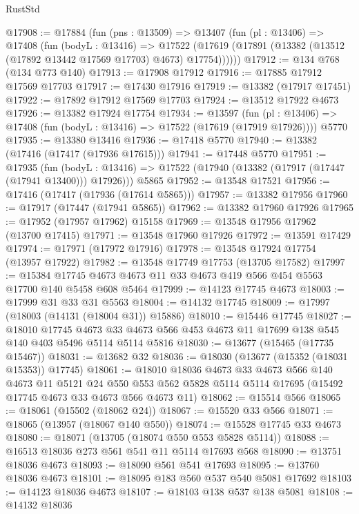 \begin{lexlean}{RustStd}
\begin{coremodule}
@17908 := @17884
    (fun (pns : @13509) =>
    @13407
      (fun (pl : @13406) =>
      @17408
        (fun (bodyL : @13416) =>
        @17522 (@17619 (@17891 (@13382 (@13512 (@17892 @13442 @17569 @17703) @4673) @17754))))))
@17912 := @134 @768 (@134 @773 @140)
@17913 := @17908 @17912
@17916 := @17885 @17912 @17569 @17703
@17917 := @17430 @17916
@17919 := @13382 (@17917 @17451)
@17922 := @17892 @17912 @17569 @17703
@17924 := @13512 @17922 @4673
@17926 := @13382 @17924 @17754
@17934 := @13597
    (fun (pl : @13406) => @17408 (fun (bodyL : @13416) => @17522 (@17619 (@17919 @17926))))
    @5770
@17935 := @13380 @13416
@17936 := @17418 @5770
@17940 := @13382 (@17416 (@17417 (@17936 @17615)))
@17941 := @17448 @5770
@17951 := @17935
    (fun (bodyL : @13416) => @17522 (@17940 (@13382 (@17917 (@17447 (@17941 @13400))) @17926)))
    @5865
@17952 := @13548 @17521
@17956 := @17416 (@17417 (@17936 (@17614 @5865)))
@17957 := @13382 @17956
@17960 := @17917 (@17447 (@17941 @5865))
@17962 := @13382 @17960 @17926
@17965 := @17952 (@17957 @17962) @15158
@17969 := @13548 @17956 @17962 (@13700 @17415)
@17971 := @13548 @17960 @17926
@17972 := @13591 @17429
@17974 := @17971 (@17972 @17916)
@17978 := @13548 @17924 @17754 (@13957 @17922)
@17982 := @13548 @17749 @17753 (@13705 @17582)
@17997 := @15384 @17745 @4673 @4673 @11 @33 @4673 @419 @566 @454 @5563 @17700 @140 @5458 @608 @5464
@17999 := @14123 @17745 @4673
@18003 := @17999 @31 @33 @31 @5563
@18004 := @14132 @17745
@18009 := @17997 (@18003 (@14131 (@18004 @31)) @15886)
@18010 := @15446 @17745
@18027 := @18010
    @17745
    @4673
    @33
    @4673
    @566
    @453
    @4673
    @11
    @17699
    @138
    @545
    @140
    @403
    @5496
    @5114
    @5114
    @5816
@18030 := @13677 (@15465 (@17735 @15467))
@18031 := @13682 @32
@18036 := @18030 (@13677 (@15352 (@18031 @15353)) @17745)
@18061 := @18010
    @18036
    @4673
    @33
    @4673
    @566
    @140
    @4673
    @11
    @5121
    @24
    @550
    @553
    @562
    @5828
    @5114
    @5114
    @17695
    (@15492 @17745 @4673 @33 @4673 @566 @4673 @11)
@18062 := @15514 @566
@18065 := @18061 (@15502 (@18062 @24))
@18067 := @15520 @33 @566
@18071 := @18065 (@13957 (@18067 @140 @550))
@18074 := @15528 @17745 @33 @4673
@18080 := @18071 (@13705 (@18074 @550 @553 @5828 @5114))
@18088 := @16513 @18036 @273 @561 @541 @11 @5114 @17693 @568
@18090 := @13751 @18036 @4673
@18093 := @18090 @561 @541 @17693
@18095 := @13760 @18036 @4673
@18101 := @18095 @183 @560 @537 @540 @5081 @17692
@18103 := @14123 @18036 @4673
@18107 := @18103 @138 @537 @138 @5081
@18108 := @14132 @18036

\end{coremodule}
\end{lexlean}
